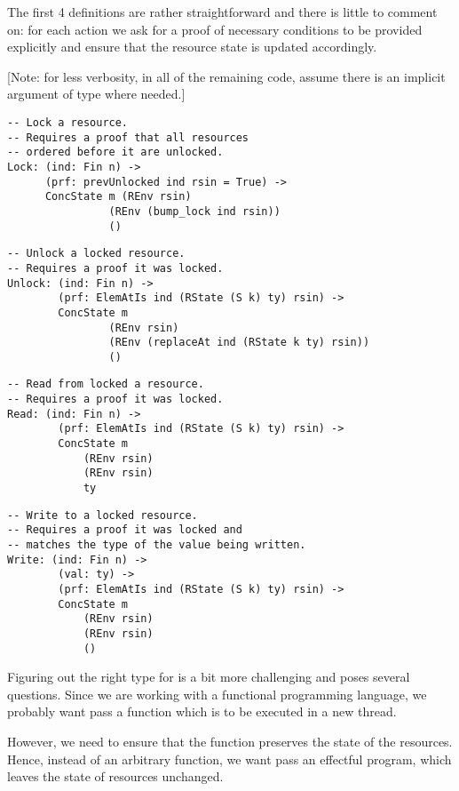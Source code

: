 The first 4 definitions are rather straightforward and there is little to
comment on: for each action we ask for a proof of necessary conditions to be
provided explicitly and ensure that the resource state is updated accordingly.

[Note: for less verbosity, in all of the remaining code, assume there is an
implicit argument  of type  where needed.]

\begin{BVerbatim}
-- Lock a resource.
-- Requires a proof that all resources
-- ordered before it are unlocked.
Lock: (ind: Fin n) ->
      (prf: prevUnlocked ind rsin = True) ->
      ConcState m (REnv rsin)
                (REnv (bump_lock ind rsin))
                ()
\end{BVerbatim}

\begin{BVerbatim}
-- Unlock a locked resource.
-- Requires a proof it was locked.
Unlock: (ind: Fin n) ->
        (prf: ElemAtIs ind (RState (S k) ty) rsin) ->
        ConcState m
                (REnv rsin)
                (REnv (replaceAt ind (RState k ty) rsin))
                ()
\end{BVerbatim}

\begin{BVerbatim}
-- Read from locked a resource.
-- Requires a proof it was locked.
Read: (ind: Fin n) ->
        (prf: ElemAtIs ind (RState (S k) ty) rsin) ->
        ConcState m
            (REnv rsin)
            (REnv rsin)
            ty
\end{BVerbatim}

\begin{BVerbatim}
-- Write to a locked resource.
-- Requires a proof it was locked and
-- matches the type of the value being written.
Write: (ind: Fin n) ->
        (val: ty) ->
        (prf: ElemAtIs ind (RState (S k) ty) rsin) ->
        ConcState m
            (REnv rsin)
            (REnv rsin)
            ()

\end{BVerbatim}

Figuring out the right type for  is a bit more challenging and
poses several questions. Since we are working with a functional programming
language, we probably want pass a function which is to be executed in a new
thread.

However, we need to ensure that the function preserves the state of
the resources. Hence, instead of an arbitrary function, we want pass an
effectful program, which leaves the state of resources unchanged.

